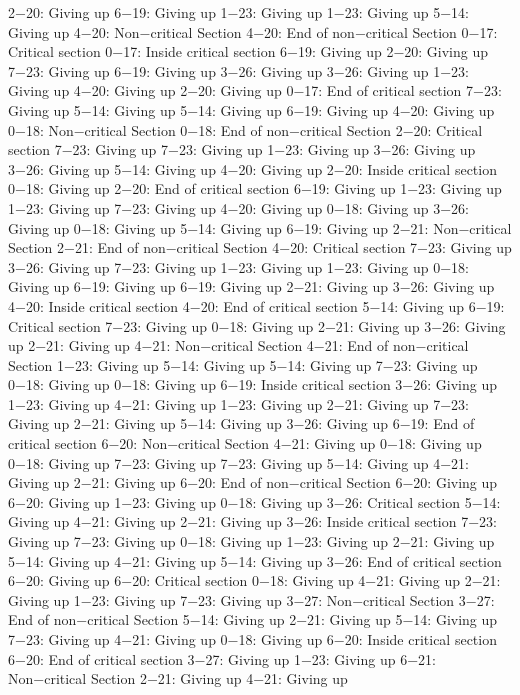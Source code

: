 2−20: Giving up
6−19: Giving up
1−23: Giving up
1−23: Giving up
5−14: Giving up
4−20: Non−critical Section
4−20: End of non−critical Section
0−17: Critical section
0−17: Inside critical section
6−19: Giving up
2−20: Giving up
7−23: Giving up
6−19: Giving up
3−26: Giving up
3−26: Giving up
1−23: Giving up
4−20: Giving up
2−20: Giving up
0−17: End of critical section
7−23: Giving up
5−14: Giving up
5−14: Giving up
6−19: Giving up
4−20: Giving up
0−18: Non−critical Section
0−18: End of non−critical Section
2−20: Critical section
7−23: Giving up
7−23: Giving up
1−23: Giving up
3−26: Giving up
3−26: Giving up
5−14: Giving up
4−20: Giving up
2−20: Inside critical section
0−18: Giving up
2−20: End of critical section
6−19: Giving up
1−23: Giving up
1−23: Giving up
7−23: Giving up
4−20: Giving up
0−18: Giving up
3−26: Giving up
0−18: Giving up
5−14: Giving up
6−19: Giving up
2−21: Non−critical Section
2−21: End of non−critical Section
4−20: Critical section
7−23: Giving up
3−26: Giving up
7−23: Giving up
1−23: Giving up
1−23: Giving up
0−18: Giving up
6−19: Giving up
6−19: Giving up
2−21: Giving up
3−26: Giving up
4−20: Inside critical section
4−20: End of critical section
5−14: Giving up
6−19: Critical section
7−23: Giving up
0−18: Giving up
2−21: Giving up
3−26: Giving up
2−21: Giving up
4−21: Non−critical Section
4−21: End of non−critical Section
1−23: Giving up
5−14: Giving up
5−14: Giving up
7−23: Giving up
0−18: Giving up
0−18: Giving up
6−19: Inside critical section
3−26: Giving up
1−23: Giving up
4−21: Giving up
1−23: Giving up
2−21: Giving up
7−23: Giving up
2−21: Giving up
5−14: Giving up
3−26: Giving up
6−19: End of critical section
6−20: Non−critical Section
4−21: Giving up
0−18: Giving up
0−18: Giving up
7−23: Giving up
7−23: Giving up
5−14: Giving up
4−21: Giving up
2−21: Giving up
6−20: End of non−critical Section
6−20: Giving up
6−20: Giving up
1−23: Giving up
0−18: Giving up
3−26: Critical section
5−14: Giving up
4−21: Giving up
2−21: Giving up
3−26: Inside critical section
7−23: Giving up
7−23: Giving up
0−18: Giving up
1−23: Giving up
2−21: Giving up
5−14: Giving up
4−21: Giving up
5−14: Giving up
3−26: End of critical section
6−20: Giving up
6−20: Critical section
0−18: Giving up
4−21: Giving up
2−21: Giving up
1−23: Giving up
7−23: Giving up
3−27: Non−critical Section
3−27: End of non−critical Section
5−14: Giving up
2−21: Giving up
5−14: Giving up
7−23: Giving up
4−21: Giving up
0−18: Giving up
6−20: Inside critical section
6−20: End of critical section
3−27: Giving up
1−23: Giving up
6−21: Non−critical Section
2−21: Giving up
4−21: Giving up
